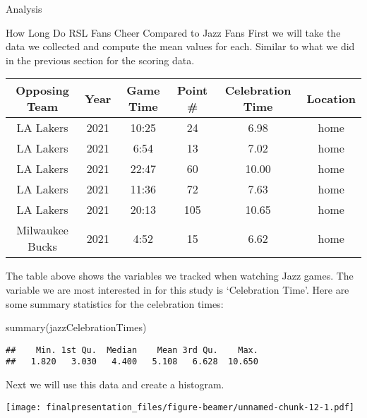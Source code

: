 \documentclass[
  ignorenonframetext,
]{beamer}
\newenvironment{Shaded}{\begin{snugshade}}{\end{snugshade}}
\newcommand{\FunctionTok}[1]{\textcolor[rgb]{0.00,0.00,0.00}{#1}}
\newcommand{\NormalTok}[1]{#1}
\begin{document}
\begin{frame}[fragile]{Analysis}
\begin{block}{How Long Do RSL Fans Cheer Compared to Jazz Fans}
\protect\hypertarget{how-long-do-rsl-fans-cheer-compared-to-jazz-fans}{}
First we will take the data we collected and compute the mean values for
each. Similar to what we did in the previous section for the scoring
data.

\begin{table}
\centering
\begin{tabular}{c|c|c|c|c|c}
\hline
Opposing Team & Year & Game Time & Point \# & Celebration  Time & Location\\
\hline
LA Lakers & 2021 & 10:25 & 24 & 6.98 & home\\
\hline
LA Lakers & 2021 & 6:54 & 13 & 7.02 & home\\
\hline
LA Lakers & 2021 & 22:47 & 60 & 10.00 & home\\
\hline
LA Lakers & 2021 & 11:36 & 72 & 7.63 & home\\
\hline
LA Lakers & 2021 & 20:13 & 105 & 10.65 & home\\
\hline
Milwaukee Bucks & 2021 & 4:52 & 15 & 6.62 & home\\
\hline
\end{tabular}
\end{table}

The table above shows the variables we tracked when watching Jazz games.
The variable we are most interested in for this study is `Celebration
Time'. Here are some summary statistics for the celebration times:

\begin{Shaded}
\begin{Highlighting}[]
\FunctionTok{summary}\NormalTok{(jazzCelebrationTimes)}
\end{Highlighting}
\end{Shaded}

\begin{verbatim}
##    Min. 1st Qu.  Median    Mean 3rd Qu.    Max. 
##   1.820   3.030   4.400   5.108   6.628  10.650
\end{verbatim}

Next we will use this data and create a histogram.

\texttt{[image: finalpresentation\_files/figure-beamer/unnamed-chunk-12-1.pdf]}


\end{block}
\end{frame}
\end{document}
